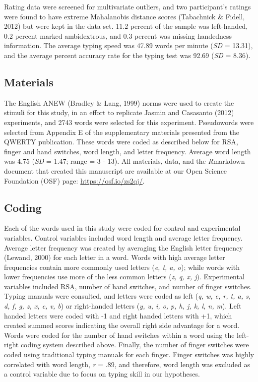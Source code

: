 \documentclass[english,man, mask]{apa6}
\theoremstyle{definition}
\theoremstyle{definition}
\theoremstyle{definition}
\theoremstyle{remark}
\begin{document}
Rating data were screened for multivariate outliers, and two
participant's ratings were found to have extreme Mahalanobis distance
scores (Tabachnick \& Fidell, 2012) but were kept in the data set. 11.2
percent of the sample was left-handed, 0.2 percent marked ambidextrous,
and 0.3 percent was missing handedness information. The average typing
speed was 47.89 words per minute (\emph{SD} = 13.31), and the average
percent accuracy rate for the typing test was 92.69 (\emph{SD} = 8.36).

\subsection{Materials}\label{materials}

The English ANEW (Bradley \& Lang, 1999) norms were used to create the
stimuli for this study, in an effort to replicate Jasmin and Casasanto
(2012) experiments, and 2743 words were selected for this experiment.
Pseudowords were selected from Appendix E of the supplementary materials
presented from the QWERTY publication. These words were coded as
described below for RSA, finger and hand switches, word length, and
letter frequency. Average word length was 4.75 (\emph{SD} = 1.47; range
= 3 - 13). All materials, data, and the \emph{R}markdown document that
created this manuscript are available at our Open Science Foundation
(OSF) page: \url{https://osf.io/zs2qj/}.

\subsection{Coding}\label{coding}

Each of the words used in this study were coded for control and
experimental variables. Control variables included word length and
average letter frequency. Average letter frequency was created by
averaging the English letter frequency (Lewand, 2000) for each letter in
a word. Words with high average letter frequencies contain more commonly
used letters (\emph{e, t, a, o}); while words with lower frequencies use
more of the less common letters (\emph{z, q, x, j}). Experimental
variables included RSA, number of hand switches, and number of finger
switches. Typing manuals were consulted, and letters were coded as left
(\emph{q, w, e, r, t, a, s, d, f, g, z, x, c, v, b}) or right-handed
letters (\emph{y, u, i, o, p, h, j, k, l, n, m}). Left handed letters
were coded with -1 and right handed letters with +1, which created
summed scores indicating the overall right side advantage for a word.
Words were coded for the number of hand switches within a word using the
left-right coding system described above. Finally, the number of finger
switches were coded using traditional typing manuals for each finger.
Finger switches was highly correlated with word length, \emph{r} = .89,
and therefore, word length was excluded as a control variable due to
focus on typing skill in our hypotheses.
\end{document}
